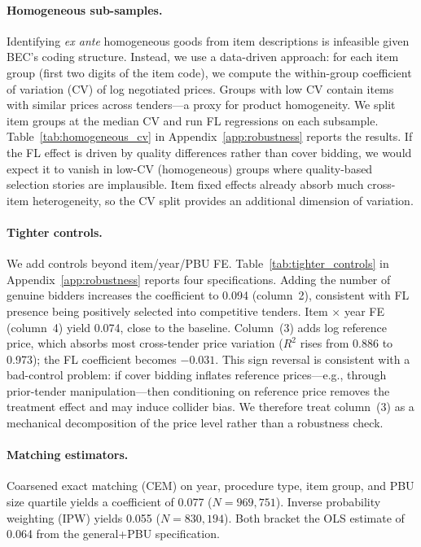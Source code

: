 \paragraph{Homogeneous sub-samples.}
Identifying \emph{ex ante} homogeneous goods from item descriptions is
infeasible given BEC's coding structure. Instead, we use a data-driven
approach: for each item group (first two digits of the item code), we
compute the within-group coefficient of variation (CV) of log negotiated
prices. Groups with low CV contain items with similar prices across
tenders---a proxy for product homogeneity. We split item groups at the
median CV and run FL regressions on each subsample.
Table~\ref{tab:homogeneous_cv} in Appendix~\ref{app:robustness} reports
the results. If the FL effect is driven by quality differences rather
than cover bidding, we would expect it to vanish in low-CV (homogeneous)
groups where quality-based selection stories are implausible. Item fixed
effects already absorb much cross-item heterogeneity, so the CV split
provides an additional dimension of variation.

\paragraph{Tighter controls.}
We add controls beyond item/year/PBU FE.
Table~\ref{tab:tighter_controls} in Appendix~\ref{app:robustness}
reports four specifications. Adding the number of genuine bidders
increases the coefficient to 0.094 (column~2), consistent with FL
presence being positively selected into competitive tenders.
Item $\times$ year FE (column~4) yield 0.074, close to the baseline.
Column~(3) adds log reference price, which absorbs most cross-tender
price variation ($R^2$ rises from 0.886 to 0.973); the FL coefficient
becomes $-0.031$. This sign reversal is consistent with a bad-control
problem: if cover bidding inflates reference prices---e.g., through
prior-tender manipulation---then conditioning on reference price removes
the treatment effect and may induce collider bias. We therefore treat
column~(3) as a mechanical decomposition of the price level rather than
a robustness check.

\paragraph{Matching estimators.}
Coarsened exact matching (CEM) on year, procedure type, item group, and
PBU size quartile yields a coefficient of 0.077 ($N = 969{,}751$).
Inverse probability weighting (IPW) yields 0.055 ($N = 830{,}194$).
Both bracket the OLS estimate of 0.064 from the general+PBU
specification.

